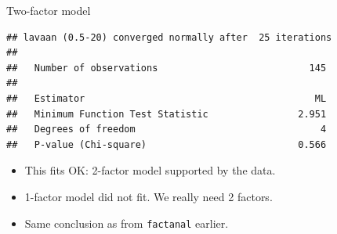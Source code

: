 \begin{frame}[fragile]{Two-factor model}

{\small  

\begin{knitrout}
\color{fgcolor}\begin{kframe}
\begin{alltt}
\hlkwb{=}\hlstd{=}\hlstd{)}
\end{alltt}
\begin{verbatim}
## lavaan (0.5-20) converged normally after  25 iterations
## 
##   Number of observations                           145
## 
##   Estimator                                         ML
##   Minimum Function Test Statistic                2.951
##   Degrees of freedom                                 4
##   P-value (Chi-square)                           0.566
\end{verbatim}
\end{kframe}
\end{knitrout}
}

\begin{itemize}
\item This fits OK: 2-factor model supported by the data.
\item 1-factor model did not fit. We really need 2 factors.
\item Same conclusion as from \texttt{factanal} earlier.
\end{itemize}
  
\end{frame}


